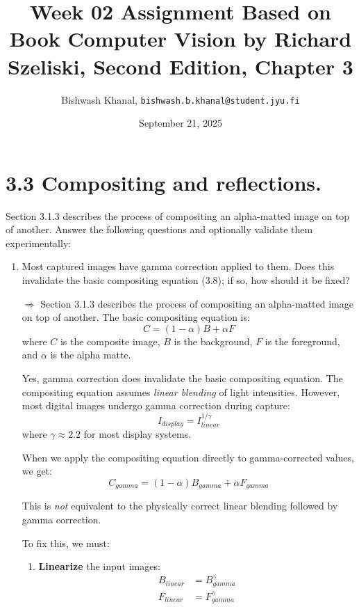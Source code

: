 \documentclass[12pt,a4paper]{article}
\title{Week 02 Assignment Based on Book Computer Vision by Richard Szeliski, Second Edition, Chapter 3}
\author{Bishwash Khanal, \texttt{bishwash.b.khanal@student.jyu.fi}}
\date{September 21, 2025}
\begin{document}
\maketitle

\section*{3.3 Compositing and reflections.}
Section 3.1.3 describes the process of compositing an alpha-matted image on top of another. Answer the following questions and optionally
validate them experimentally:
\begin{enumerate}
    \item Most captured images have gamma correction applied to them. Does this invalidate the
basic compositing equation (3.8); if so, how should it be ﬁxed?
    

$\Rightarrow$ Section 3.1.3 describes the process of compositing an alpha-matted image on top of another. The basic compositing equation is:
\begin{equation}
C = (1 - \alpha)B + \alpha F
\end{equation}
where $C$ is the composite image, $B$ is the background, $F$ is the foreground, and $\alpha$ is the alpha matte.

Yes, gamma correction does invalidate the basic compositing equation. The compositing equation assumes \emph{linear blending} of light intensities. 
However, most digital images undergo gamma correction during capture:
\begin{equation}
I_{display} = I_{linear}^{1/\gamma}
\end{equation}
where $\gamma \approx 2.2$ for most display systems.

When we apply the compositing equation directly to gamma-corrected values, we get:
\begin{equation}
C_{gamma} = (1 - \alpha)B_{gamma} + \alpha F_{gamma}
\end{equation}

This is \emph{not} equivalent to the physically correct linear blending followed by gamma correction.

To fix this, we must:

\begin{enumerate}
\item \textbf{Linearize} the input images:
\begin{align}
B_{linear} &= B_{gamma}^{\gamma}\\
F_{linear} &= F_{gamma}^{\gamma}
\end{align}


\end{enumerate}
\end{enumerate}
\end{document}
